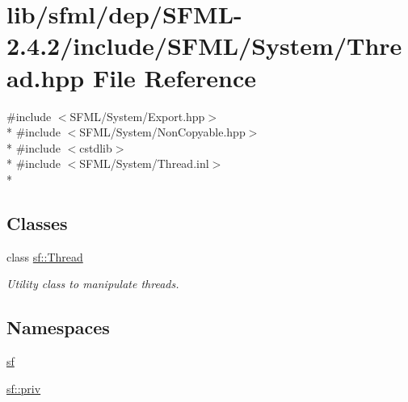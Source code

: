 \hypertarget{sfml_2dep_2_s_f_m_l-2_84_82_2include_2_s_f_m_l_2_system_2_thread_8hpp}{\section{lib/sfml/dep/\-S\-F\-M\-L-\/2.4.2/include/\-S\-F\-M\-L/\-System/\-Thread.hpp File Reference}
\label{sfml_2dep_2_s_f_m_l-2_84_82_2include_2_s_f_m_l_2_system_2_thread_8hpp}
}
{\ttfamily \#include $<$S\-F\-M\-L/\-System/\-Export.\-hpp$>$}\\*
{\ttfamily \#include $<$S\-F\-M\-L/\-System/\-Non\-Copyable.\-hpp$>$}\\*
{\ttfamily \#include $<$cstdlib$>$}\\*
{\ttfamily \#include $<$S\-F\-M\-L/\-System/\-Thread.\-inl$>$}\\*
\subsection*{Classes}
\begin{DoxyCompactItemize}
\item 
class \hyperlink{classsf_1_1_thread}{sf\-::\-Thread}
\begin{DoxyCompactList}\small\item\em Utility class to manipulate threads. \end{DoxyCompactList}\end{DoxyCompactItemize}
\subsection*{Namespaces}
\begin{DoxyCompactItemize}
\item 
\hyperlink{namespacesf}{sf}
\item 
\hyperlink{namespacesf_1_1priv}{sf\-::priv}
\end{DoxyCompactItemize}
